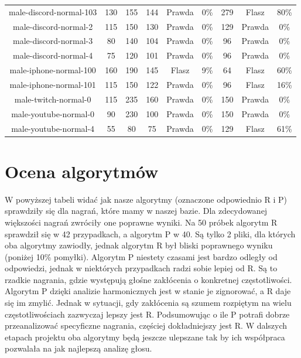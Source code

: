 \documentclass[a4paper,12pt]{extarticle}
\begin{document}
\begin{center}
{\begin{tabular}{ |c|c|c|c|c|c|c|c|c| }
male-discord-normal-103 & 130 & 155 & 144 & Prawda & 0\% & 279 & Flasz & 80\% \\
male-discord-normal-2 & 115 & 150 & 130 & Prawda & 0\% & 129 & Prawda & 0\% \\
male-discord-normal-3 & 80 & 140 & 104 & Prawda & 0\% & 96 & Prawda & 0\% \\
male-discord-normal-4 & 75 & 120 & 101 & Prawda & 0\% & 96 & Prawda & 0\% \\
male-iphone-normal-100 & 160 & 190 & 145 & Flasz & 9\% & 64 & Flasz & 60\% \\
male-iphone-normal-101 & 115 & 150 & 122 & Prawda & 0\% & 96 & Flasz & 16\% \\
male-twitch-normal-0 & 115 & 235 & 160 & Prawda & 0\% & 150 & Prawda & 0\% \\
male-youtube-normal-0 & 90 & 230 & 100 & Prawda & 0\% & 150 & Prawda & 0\% \\
male-youtube-normal-4 & 55 & 80 & 75 & Prawda & 0\% & 129 & Flasz & 61\% \\
 \hline
\end{tabular}}
\end{center}

\clearpage

\section*{Ocena algorytmów}

W powyższej tabeli widać jak nasze algorytmy (oznaczone odpowiednio R i P) sprawdziły się dla nagrań, które mamy w naszej bazie. Dla zdecydowanej większości nagrań zwróciły one poprawne wyniki. Na 50 próbek algorytm R sprawdził się w 42 przypadkach, a algorytm P w 40. Są tylko 2 pliki, dla których oba algorytmy zawiodły, jednak algorytm R był bliski poprawnego wyniku (poniżej 10\% pomyłki).
Algorytm P niestety czasami jest bardzo odległy od odpowiedzi, jednak w niektórych przypadkach radzi sobie lepiej od R. Są to rzadkie nagrania, gdzie występują głośne zakłócenia o konkretnej częstotliwości. Algorytm P dzięki analizie harmonicznych jest w stanie je zignorować, a R daje się im zmylić. Jednak w sytuacji, gdy zakłócenia są szumem rozpiętym na wielu częstotliwościach zazwyczaj lepszy jest R.
Podsumowując o ile P potrafi dobrze przeanalizować specyficzne nagrania, częściej dokładniejszy jest R. W dalszych etapach projektu oba algorytmy będą jeszcze ulepszane tak by ich współpraca pozwalała na jak najlepszą analizę głosu.

\clearpage

\printbibliography[title=Bibliografia]
\end{document}
